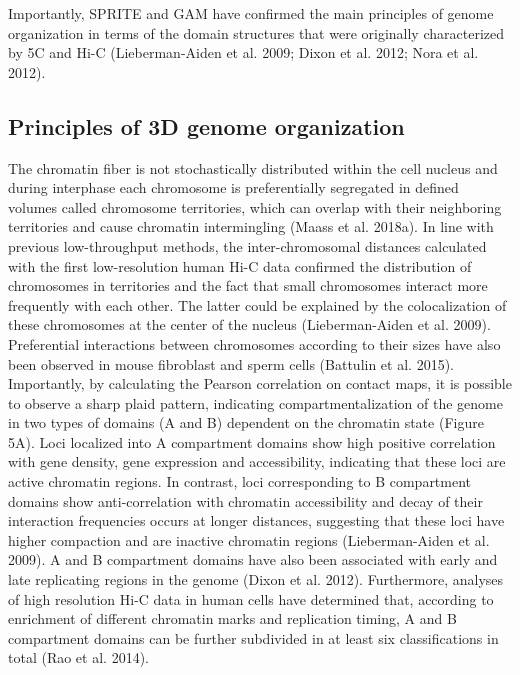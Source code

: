 Importantly, SPRITE and GAM have confirmed the main principles of genome organization in terms of the domain structures that were originally characterized by 5C and Hi-C (Lieberman-Aiden et al. 2009; Dixon et al. 2012; Nora et al. 2012).\\

		\subsection{Principles of 3D genome organization}

The chromatin fiber is not stochastically distributed within the cell nucleus and during interphase each chromosome is preferentially segregated in defined volumes called chromosome territories, which can overlap with their neighboring territories and cause chromatin intermingling (Maass et al. 2018a). In line with previous low-throughput methods, the inter-chromosomal distances calculated with the first low-resolution human Hi-C data confirmed the distribution of chromosomes in territories and the fact that small chromosomes interact more frequently with each other. The latter could be explained by the colocalization of these chromosomes at the center of the nucleus (Lieberman-Aiden et al. 2009). Preferential interactions between chromosomes according to their sizes have also been observed in mouse fibroblast and sperm cells (Battulin et al. 2015). Importantly, by calculating the Pearson correlation on contact maps, it is possible to observe a sharp plaid pattern, indicating compartmentalization of the genome in two types of domains (A and B) dependent on the chromatin state (Figure 5A). Loci localized into A compartment domains show high positive correlation with gene density, gene expression and accessibility, indicating that these loci are active chromatin regions. In contrast, loci corresponding to B compartment domains show anti-correlation with chromatin accessibility and decay of their interaction frequencies occurs at longer distances, suggesting that these loci have higher compaction and are inactive chromatin regions (Lieberman-Aiden et al. 2009). A and B compartment domains have also been associated with early and late replicating regions in the genome (Dixon et al. 2012). Furthermore, analyses of high resolution Hi-C data in human cells have determined that, according to enrichment of different chromatin marks and replication timing, A and B compartment domains can be further subdivided in at least six classifications in total (Rao et al. 2014).\\

